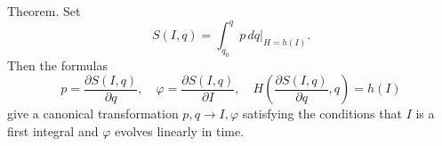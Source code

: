 Theorem. Set
$$S(I, q) = \int_{q_0}^{q} p \, dq \bigg|_{H=h(I)}.$$
Then the formulas
$$p = \frac{\partial S(I, q)}{\partial q}, \quad \varphi = \frac{\partial S(I, q)}{\partial I}, \quad H\left(\frac{\partial S(I, q)}{\partial q}, q\right) = h(I)$$
give a canonical transformation $p, q \to I, \varphi$ satisfying the conditions that $I$ is a first integral and $\varphi$ evolves linearly in time.
